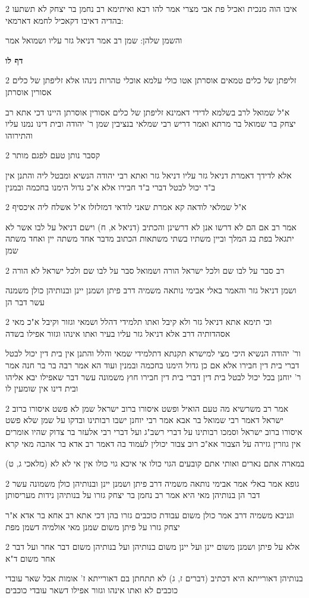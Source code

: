 \documentclass[12pt, openany]{book}
\newcommand{\sethebfont}{
\fontsize{10.5pt}{21.0pt} \selectfont
}
\newcommand{\twocol}[1]{
	{\sethebfont \begin{multicols}{2}
			#1
	\end{multicols}}	
}
\newcommand{\sectname}{}
\newcommand{\newsection}[1]{
	\addcontentsline{toc}{section}{#1}
	\renewcommand{\sectname}{#1}	
	\vspace{-\baselineskip}
	\begin{center}
		\textbf{%
\fontsize{16pt}{16pt}\selectfont
			#1}
	\end{center}
	\vspace{-\baselineskip}
	\nopagebreak
}
\begin{document}
\twocol{איבו הוה מנכית ואכיל פת אבי מצרי אמר להו רבא ואיתימא רב נחמן בר יצחק לא תשתעו בהדיה דאיבו דקאכיל לחמא דארמאי:
\par והשמן שלהן: שמן רב אמר דניאל גזר עליו ושמואל אמר}
\newsection{דף לו}
\twocol{זליפתן של כלים טמאים אוסרתן אטו כולי עלמא אוכלי טהרות נינהו אלא זליפתן של כלים אסורין אוסרתן
\par א"ל שמואל לרב בשלמא לדידי דאמינא זליפתן של כלים אסורין אוסרתן היינו דכי אתא רב יצחק בר שמואל בר מרתא ואמר דריש רבי שמלאי בנציבין שמן ר' יהודה ובית דינו נמנו עליו והתירוהו}
\twocol{קסבר נותן טעם לפגם מותר
\par אלא לדידך דאמרת דניאל גזר עליו דניאל גזר ואתא רבי יהודה הנשיא ומבטל ליה והתנן אין ב"ד יכול לבטל דברי ב"ד חבירו אלא א"כ גדול הימנו בחכמה ובמנין}
\twocol{א"ל שמלאי לודאה קא אמרת שאני לודאי דמזלזלו א"ל אשלח ליה איכסיף
\par אמר רב אם הם לא דרשו אנן לא דרשינן והכתיב (דניאל א, ח) וישם דניאל על לבו אשר לא יתגאל בפת בג המלך וביין משתיו בשתי משתאות הכתוב מדבר אחד משתה יין ואחד משתה שמן}
\twocol{רב סבר על לבו שם ולכל ישראל הורה ושמואל סבר על לבו שם ולכל ישראל לא הורה
\par ושמן דניאל גזר והאמר באלי אבימי נותאה משמיה דרב פיתן ושמנן יינן ובנותיהן כולן משמנה עשר דבר הן}
\twocol{וכי תימא אתא דניאל גזר ולא קיבל ואתו תלמידי דהלל ושמאי וגזור וקיבל א"כ מאי אסהדותיה דרב אלא דניאל גזר עליו בעיר ואתו אינהו וגזור אפילו בשדה
\par ור' יהודה הנשיא היכי מצי למישרא תקנתא דתלמידי שמאי והלל והתנן אין בית דין יכול לבטל דברי בית דין חבירו אלא אם כן גדול הימנו בחכמה ובמנין ועוד הא אמר רבה בר בר חנה אמר ר' יוחנן בכל יכול לבטל בית דין דברי בית דין חבירו חוץ משמונה עשר דבר שאפילו יבא אליהו ובית דינו אין שומעין לו}
\twocol{אמר רב משרשיא מה טעם הואיל ופשט איסורו ברוב ישראל שמן לא פשט איסורו ברוב ישראל דאמר רבי שמואל בר אבא אמר רבי יוחנן ישבו רבותינו ובדקו על שמן שלא פשט איסורו ברוב ישראל וסמכו רבותינו על דברי רשב"ג ועל דברי רבי אלעזר בר צדוק שהיו אומרים אין גוזרין גזירה על הצבור אא"כ רוב צבור יכולין לעמוד בה דאמר רב אדא בר אהבה מאי קרא
\par (מלאכי ג, ט) במארה אתם נארים ואותי אתם קובעים הגוי כולו אי איכא גוי כולו אין אי לא לא}
\twocol{גופא אמר באלי אמר אבימי נותאה משמיה דרב פיתן ושמנן יינן ובנותיהן כולן משמונה עשר דבר הן בנותיהן מאי היא אמר רב נחמן בר יצחק גזרו על בנותיהן נידות מעריסותן
\par וגניבא משמיה דרב אמר כולן משום עבודת כוכבים גזרו בהן דכי אתא רב אחא בר אדא א"ר יצחק גזרו על פיתן משום שמנן מאי אולמיה דשמן מפת}
\twocol{אלא על פיתן ושמנן משום יינן ועל יינן משום בנותיהן ועל בנותיהן משום דבר אחר ועל דבר אחר משום ד"א
\par בנותיהן דאורייתא היא דכתיב (דברים ז, ג) לא תתחתן בם דאורייתא ז' אומות אבל שאר עובדי כוכבים לא ואתו אינהו וגזור אפילו דשאר עובדי כוכבים}
\end{document}

